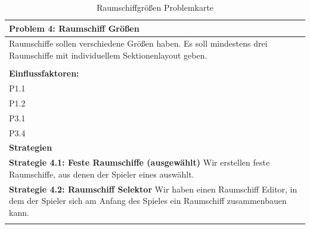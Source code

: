 \documentclass[fontsize=12pt,paper=a4,twoside]{scrartcl}
\begin{document}
\begin{table}[H]
    \centering
    \begin{tabular}{|p{15cm}|}
    \hline
          \textbf{Problem 4: Raumschiff Größen}  \\ \hline
	Raumschiffe sollen verschiedene Größen haben. Es soll mindestens drei Raumschiffe mit individuellem Sektionenlayout geben. \\
         \\ \hline
          \textbf{Einflussfaktoren: } \\
	P1.1 \\
	P1.2 \\
	P3.1 \\
	P3.4 \\
          \hline
          \textbf{Strategien} \\ \hline
            {}          
           \label{strategie:4.1}     
          \textbf{Strategie 4.1: Feste Raumschiffe  (ausgewählt)} Wir erstellen feste Raumschiffe, aus denen der Spieler eines auswählt. \\        
  {}          
           \label{strategie:4.2}              
          \textbf{Strategie 4.2: Raumschiff Selektor} Wir haben einen Raumschiff Editor, in dem der Spieler sich am Anfang des Spieles ein Raumschiff zusammenbauen kann. \\
	 \\ \hline
    \end{tabular}

    \caption{Raumschiffgrößen Problemkarte}
    \label{tab:ProblemKarte4}
\end{table}
\end{document}
